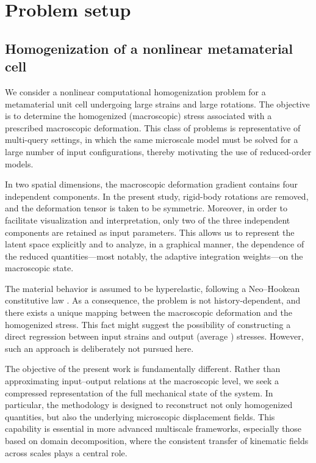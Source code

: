 \documentclass[11pt,a4paper]{article}
\newcommand{\PROMPT}[1]{ }
\begin{document}

\section{Problem setup}

\PROMPT{}


\subsection{Homogenization of a nonlinear metamaterial cell}

We consider a nonlinear computational homogenization problem for a metamaterial
unit cell undergoing large strains and large rotations. The objective is to
determine the homogenized (macroscopic) stress associated with a prescribed
macroscopic deformation. This class of problems is representative of
multi-query settings, in which the same microscale model must be solved for a
large number of input configurations, thereby motivating the use of
reduced-order models.

In two spatial dimensions, the macroscopic deformation gradient contains four
independent components. In the present study, rigid-body rotations are removed,
and the deformation tensor is taken to be symmetric. Moreover, in order to
facilitate visualization and interpretation, only two of the three independent
components are retained as input parameters. This allows us to represent the
latent space explicitly and to analyze, in a graphical manner, the dependence of
the reduced quantities—most notably, the adaptive integration weights—on the
macroscopic state.

The material behavior is assumed to be hyperelastic, following a Neo--Hookean
constitutive law . As a consequence, the problem is not history-dependent, and
there exists a unique mapping between the macroscopic deformation and the
homogenized stress. This fact might suggest the possibility of constructing a
direct regression between input strains and output  (average ) stresses. However, such an
approach is deliberately not pursued here.

The objective of the present work is fundamentally different. Rather than
approximating input--output relations at the macroscopic level, we seek a
compressed representation of the full mechanical state of the system. In
particular, the methodology is designed to reconstruct not only homogenized
quantities, but also the underlying microscopic displacement fields. This
capability is essential in more advanced multiscale frameworks, especially those
based on domain decomposition, where the consistent transfer of kinematic fields
across scales plays a central role.
\end{document}
